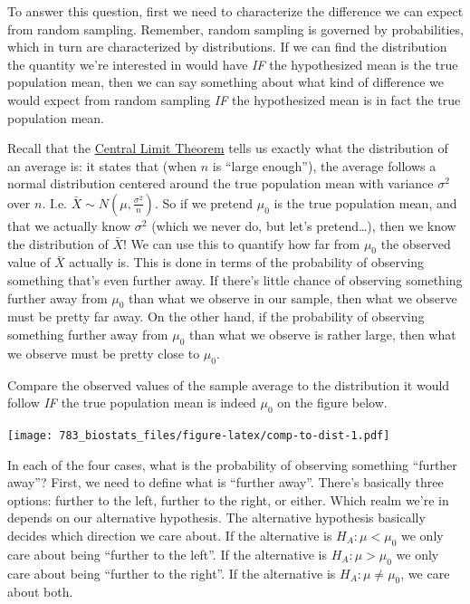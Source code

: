 \documentclass[]{book}
\theoremstyle{definition}
\theoremstyle{definition}
\theoremstyle{definition}
\theoremstyle{remark}
\begin{document}
To answer this question, first we need to characterize the difference we can expect from random sampling. Remember, random sampling is governed by probabilities, which in turn are characterized by distributions. If we can find the distribution the quantity we're interested in would have \emph{IF} the hypothesized mean is the true population mean, then we can say something about what kind of difference we would expect from random sampling \emph{IF} the hypothesized mean is in fact the true population mean.

Recall that the \protect\hyperlink{CLT}{Central Limit Theorem} tells us exactly what the distribution of an average is: it states that (when \(n\) is ``large enough''), the average follows a normal distribution centered around the true population mean with variance \(\sigma^2\) over \(n\). I.e. \(\bar{X} \sim N\left(\mu, \frac{\sigma^2}{n}\right)\). So if we pretend \(\mu_0\) is the true population mean, and that we actually know \(\sigma^2\) (which we never do, but let's pretend\ldots), then we know the distribution of \(\bar{X}\)! We can use this to quantify how far from \(\mu_0\) the observed value of \(\bar{X}\) actually is. This is done in terms of the probability of observing something that's even further away. If there's little chance of observing something further away from \(\mu_0\) than what we observe in our sample, then what we observe must be pretty far away. On the other hand, if the probability of observing something further away from \(\mu_0\) than what we observe is rather large, then what we observe must be pretty close to \(\mu_0\).

Compare the observed values of the sample average to the distribution it would follow \emph{IF} the true population mean is indeed \(\mu_0\) on the figure below.

\texttt{[image: 783\_biostats\_files/figure-latex/comp-to-dist-1.pdf]}

In each of the four cases, what is the probability of observing something ``further away''? First, we need to define what is ``further away''. There's basically three options: further to the left, further to the right, or either. Which realm we're in depends on our alternative hypothesis. The alternative hypothesis basically decides which direction we care about. If the alternative is \(H_A: \mu < \mu_0\) we only care about being ``further to the left''. If the alternative is \(H_A: \mu > \mu_0\) we only care about being ``further to the right''. If the alternative is \(H_A: \mu \neq \mu_0\), we care about both.
\end{document}
